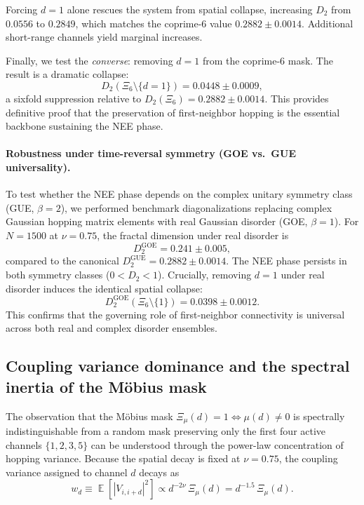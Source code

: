 \documentclass[11pt,a4paper]{article}
\DeclareMathOperator{\E}{\mathbb{E}}
\begin{document}
Forcing $d = 1$ alone rescues the system from spatial collapse, increasing $D_2$ from $0.0556$ to $0.2849$, which matches the coprime-6 value $0.2882 \pm 0.0014$. Additional short-range channels yield marginal increases.

Finally, we test the \emph{converse}: removing $d = 1$ from the coprime-6 mask. The result is a dramatic collapse:
\begin{equation}
D_2(\Xi_6 \setminus \{d = 1\}) = 0.0448 \pm 0.0009,
\end{equation}
a sixfold suppression relative to $D_2(\Xi_6) = 0.2882 \pm 0.0014$. This provides definitive proof that the preservation of first-neighbor hopping is the essential backbone sustaining the NEE phase.

\paragraph{Robustness under time-reversal symmetry (GOE vs.\ GUE universality).}
To test whether the NEE phase depends on the complex unitary symmetry class (GUE, $\beta = 2$), we performed benchmark diagonalizations replacing complex Gaussian hopping matrix elements with real Gaussian disorder (GOE, $\beta = 1$). For $N = 1500$ at $\nu = 0.75$, the fractal dimension under real disorder is
\begin{equation}
D_2^{\text{GOE}} = 0.241 \pm 0.005,
\end{equation}
compared to the canonical $D_2^{\text{GUE}} = 0.2882 \pm 0.0014$. The NEE phase persists in both symmetry classes ($0 < D_2 < 1$). Crucially, removing $d=1$ under real disorder induces the identical spatial collapse:
\begin{equation}
D_2^{\text{GOE}}(\Xi_6 \setminus \{1\}) = 0.0398 \pm 0.0012.
\end{equation}
This confirms that the governing role of first-neighbor connectivity is universal across both real and complex disorder ensembles.

\subsection{Coupling variance dominance and the spectral inertia of the Möbius mask}
\label{subsec:mobius_variance_dominance}

The observation that the Möbius mask $\Xi_\mu(d) = 1 \iff \mu(d) \neq 0$ is spectrally indistinguishable from a random mask preserving only the first four active channels $\{1, 2, 3, 5\}$ can be understood through the power-law concentration of hopping variance. Because the spatial decay is fixed at $\nu = 0.75$, the coupling variance assigned to channel $d$ decays as
\begin{equation}
w_d \equiv \E[|V_{i, i+d}|^2] \propto d^{-2\nu} \, \Xi_\mu(d) = d^{-1.5} \, \Xi_\mu(d).
\end{equation}
\end{document}
